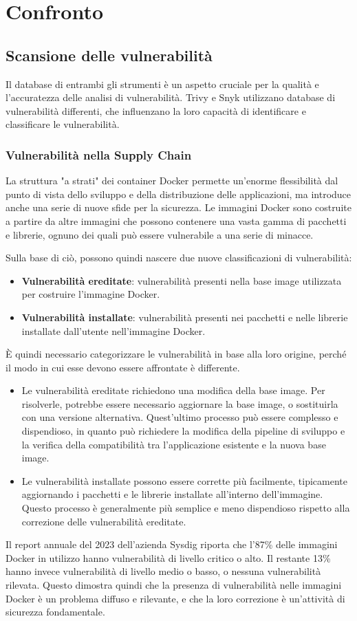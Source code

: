 \chapter{Confronto}
\section{Scansione delle vulnerabilità}
Il database di entrambi gli strumenti è un aspetto cruciale per la qualità e l'accuratezza delle analisi di vulnerabilità. Trivy e Snyk utilizzano database di vulnerabilità differenti, che influenzano la loro capacità di identificare e classificare le vulnerabilità.
\subsection{Vulnerabilità nella Supply Chain}
La struttura "a strati" dei container Docker permette un'enorme flessibilità dal punto di vista dello sviluppo e della distribuzione delle applicazioni, ma introduce anche una serie di nuove sfide per la sicurezza. Le immagini Docker sono costruite a partire da altre immagini che possono contenere una vasta gamma di pacchetti e librerie, ognuno dei quali può essere vulnerabile a una serie di minacce.

Sulla base di ciò, possono quindi nascere due nuove classificazioni di vulnerabilità:

\begin{itemize}
   \item \textbf{Vulnerabilità ereditate}: vulnerabilità presenti nella base image utilizzata per costruire l'immagine Docker.
   \item \textbf{Vulnerabilità installate}: vulnerabilità presenti nei pacchetti e nelle librerie installate dall'utente nell'immagine Docker.
\end{itemize}
È quindi necessario categorizzare le vulnerabilità in base alla loro origine, perché il modo in cui esse devono essere affrontate è differente.
\begin{itemize}
   \item Le vulnerabilità ereditate richiedono una modifica della base image. Per risolverle, potrebbe essere necessario aggiornare la base image, o sostituirla con una versione alternativa. Quest'ultimo processo può essere complesso e dispendioso, in quanto può richiedere la modifica della pipeline di sviluppo e la verifica della compatibilità tra l'applicazione esistente e la nuova base image.
   \item Le vulnerabilità installate possono essere corrette più facilmente, tipicamente aggiornando i pacchetti e le librerie installate all'interno dell'immagine. Questo processo è generalmente più semplice e meno dispendioso rispetto alla correzione delle vulnerabilità ereditate.
\end{itemize}
Il report annuale del 2023 dell'azienda Sysdig\cite{sysdig_report} riporta che l'87\% delle immagini Docker in utilizzo hanno vulnerabilità di livello critico o alto. Il restante 13\% hanno invece vulnerabilità di livello medio o basso, o nessuna vulnerabilità rilevata. Questo dimostra quindi che la presenza di vulnerabilità nelle immagini Docker è un problema diffuso e rilevante, e che la loro correzione è un'attività di sicurezza fondamentale.


